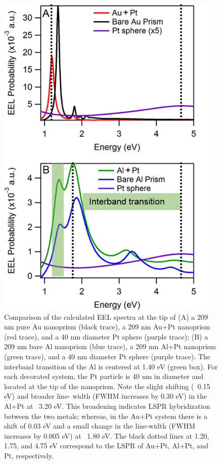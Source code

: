 \documentclass [11pt, proquest] {uwthesis}[2016/11/22]
\begin{document}
\begin{figure}
\begin{centering}
\includegraphics{prisms_EELS_simulation.png}
\caption{Comparison of the calculated EEL spectra at the tip of (A) a 209 nm pure Au nanoprism (black trace), a 209 nm Au+Pt nanoprism (red trace), and a 40 nm diameter Pt sphere (purple trace); (B) a 209 nm bare Al nanoprism (blue trace), a 209 nm Al+Pt nanoprism (green trace), and a 40 nm diameter Pt sphere (purple trace). The interband transition of the Al is centered at 1.40 eV (green box). For each decorated system, the Pt particle is 40 nm in diameter and located at the tip of the nanoprism. Note the slight shifting (~0.15 eV) and broader line- width (FWHM increases by 0.30 eV) in the Al+Pt at ~3.20 eV. This broadening indicates LSPR hybridization between the two metals; whereas, in the Au+Pt system there is a shift of 0.03 eV and a small change in the line-width (FWHM increases by 0.005 eV) at ~1.80 eV. The black dotted lines at 1.20, 1.75, and 4.75 eV correspond to the LSPR of Au+Pt, Al+Pt, and Pt, respectively.}
\label{prisms_EELS_sim}
\end{centering}
\end{figure}
\end{document}
